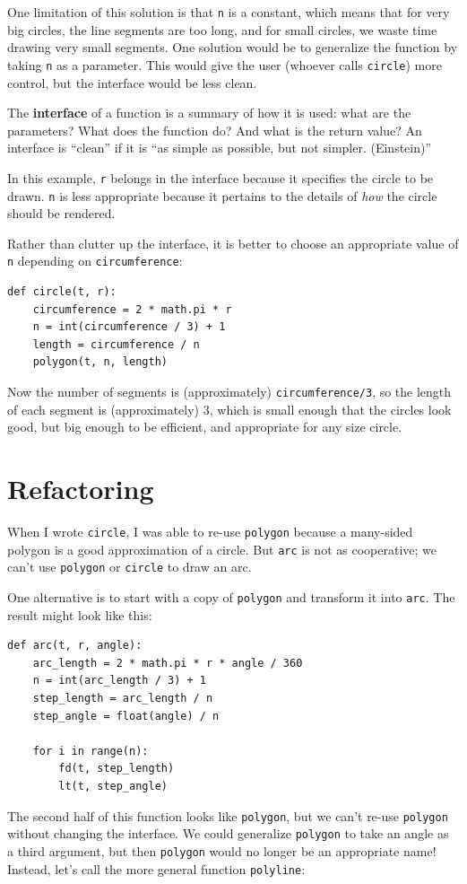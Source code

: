 \documentclass[10pt]{book}
\begin{document}
One limitation of this solution is that {\tt n} is a constant, which
means that for very big circles, the line segments are too long, and
for small circles, we waste time drawing very small segments.  One
solution would be to generalize the function by taking {\tt n} as
a parameter.  This would give the user (whoever calls {\tt circle})
more control, but the interface would be less clean.


The {\bf interface} of a function is a summary of how it is used: what
are the parameters?  What does the function do?  And what is the return
value?  An interface is ``clean'' if it is ``as simple as
possible, but not simpler. (Einstein)''


In this example, {\tt r} belongs in the interface because it
specifies the circle to be drawn.  {\tt n} is less appropriate
because it pertains to the details of {\em how} the circle should
be rendered.

Rather than clutter up the interface, it is better
to choose an appropriate value of {\tt n}
depending on {\tt circumference}:

\beforeverb
\begin{verbatim}
def circle(t, r):
    circumference = 2 * math.pi * r
    n = int(circumference / 3) + 1
    length = circumference / n
    polygon(t, n, length)
\end{verbatim}
\afterverb
%
Now the number of segments is (approximately) {\tt circumference/3},
so the length of each segment is (approximately) 3, which is small
enough that the circles look good, but big enough to be efficient,
and appropriate for any size circle.


\section{Refactoring}
\label{refactoring}

When I wrote {\tt circle}, I was able to re-use {\tt polygon}
because a many-sided polygon is a good approximation of a circle.
But {\tt arc} is not as cooperative; we can't use {\tt polygon}
or {\tt circle} to draw an arc.

One alternative is to start with a copy
of {\tt polygon} and transform it into {\tt arc}.  The result
might look like this:

\beforeverb
\begin{verbatim}
def arc(t, r, angle):
    arc_length = 2 * math.pi * r * angle / 360
    n = int(arc_length / 3) + 1
    step_length = arc_length / n
    step_angle = float(angle) / n
    
    for i in range(n):
        fd(t, step_length)
        lt(t, step_angle)
\end{verbatim}
\afterverb
%
The second half of this function looks like {\tt polygon}, but we
can't re-use {\tt polygon} without changing the interface.  We could
generalize {\tt polygon} to take an angle as a third argument,
but then {\tt polygon} would no longer be an appropriate name!
Instead, let's call the more general function {\tt polyline}:
\end{document}

